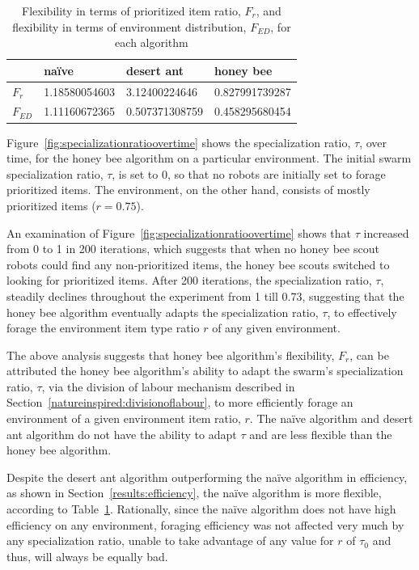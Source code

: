  
\begin{table}[]
\centering
\caption{Flexibility in terms of prioritized item ratio, $F_r$, and flexibility in terms of environment distribution, $F_{ED}$, for each algorithm}
\label{table:flexibility}
\begin{tabular}{@{}llll@{}}
\toprule
\textbf{}         & na\"ive         & desert ant        & honey bee         \\ \midrule
\textbf{$F_r$}    & 1.18580054603 & 3.12400224646     & 0.827991739287    \\ \midrule
\textbf{$F_{ED}$} & 1.11160672365 & 0.507371308759 & 0.458295680454 
\end{tabular}
\end{table}



Figure~\ref{fig:specializationratioovertime} shows the specialization ratio, $\tau$, over time, for the honey bee algorithm on a particular environment. The initial swarm specialization ratio, $\tau$, is set to 0, so that no robots are initially set to forage prioritized items. The environment, on the other hand, consists of mostly prioritized items ($r=0.75$). 

An examination of Figure~\ref{fig:specializationratioovertime} shows that $\tau$ increased from 0 to 1 in 200 iterations, which suggests that when no honey bee scout robots could find any non-prioritized items, the honey bee scouts switched to looking for prioritized items. After 200 iterations, the specialization ratio, $\tau$, steadily declines throughout the experiment from 1 till 0.73, suggesting that the honey bee algorithm eventually adapts the specialization ratio, $\tau$, to effectively forage the environment item type ratio $r$ of any given environment.

The above analysis suggests that honey bee algorithm's flexibility, $F_r$, can be attributed the honey bee algorithm's ability to adapt the swarm's specialization ratio, $\tau$, via the division of labour mechanism described in Section~\ref{natureinspired:divisionoflabour}, to more efficiently forage an environment of a given environment item ratio, $r$. The na\"ive algorithm and desert ant algorithm do not have the ability to adapt $\tau$ and are less flexible than the honey bee algorithm.

Despite the desert ant algorithm outperforming the na\"ive algorithm in efficiency, as shown in Section~\ref{results:efficiency}, the na\"ive algorithm is more flexible, according to Table~\ref{table:flexibility}. Rationally, since the na\"ive algorithm does not have high efficiency on any environment, foraging efficiency was not affected very much by any specialization ratio, unable to take advantage of any value for $r$ of $\tau_0$ and thus, will always be equally bad.

